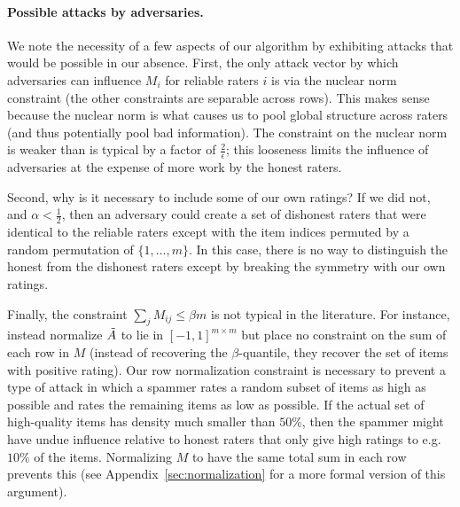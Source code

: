 \paragraph{Possible attacks by adversaries.} We note the necessity of a 
few aspects of our algorithm by exhibiting attacks that would be possible 
in our absence. First, the only attack vector by which adversaries can 
influence $M_i$ for reliable raters $i$ is via the nuclear norm constraint 
(the other constraints are separable across rows). This makes sense because 
the nuclear norm is what causes us to pool global structure across 
raters (and thus potentially pool bad information). The constraint on the 
nuclear norm is weaker than is typical by a factor of $\frac{2}{\epsilon}$; 
this looseness limits the influence of adversaries at the expense of more 
work by the honest raters.

Second, why is it necessary to include some of our own ratings? 
If we did not, and $\alpha < \frac{1}{2}$, then an adversary could create a set of 
dishonest raters that were identical to the reliable raters except with the 
item indices permuted by a random permutation of $\{1,\ldots,m\}$. In this case, 
there is no way to distinguish the honest from the dishonest raters except by 
breaking the symmetry with our own ratings.

Finally, the constraint $\sum_j M_{ij} \leq \beta m$ is 
not typical in the literature. For instance, \citep{chen2014improved} 
instead normalize $\tilde{A}$ to lie in $[-1,1]^{m \times m}$ but place no 
constraint on the sum of each row in $M$ (instead of recovering 
the $\beta$-quantile, they recover the set of items with positive rating).
Our row normalization constraint is necessary to prevent a type of attack 
in which a spammer rates a random subset of items as high as possible and 
rates the remaining items as low as possible. If the actual set of 
high-quality items has density much smaller than $50\%$, then the 
spammer might have undue influence relative to honest raters that 
only give high ratings to e.g. $10\%$ of the items. Normalizing $M$ to 
have the same total sum in each row prevents this (see 
Appendix~\ref{sec:normalization} for a more formal version of this argument).
